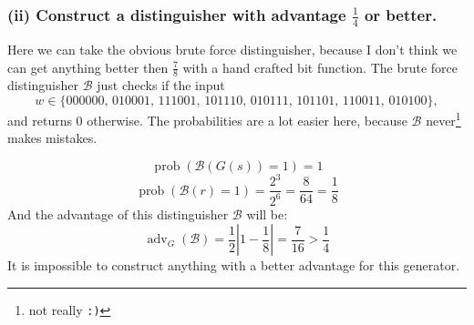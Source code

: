 \documentclass{article}
\begin{document}
  \subsubsection*{(ii) Construct a distinguisher with advantage $\frac{1}{4}$ or better.}
  Here we can take the obvious brute force distinguisher, because I don't think we can get anything better then $\frac{7}{8}$ with a hand crafted bit function.
  The brute force distinguisher $\mathcal{B}$ just checks if the input
  \[w \in \{000000,\, 010001,\, 111001,\, 101110,\, 010111,\, 101101,\, 110011,\, 010100\},\]
  and returns 0 otherwise.
  The probabilities are a lot easier here, because $\mathcal{B}$ never\footnote{not really \texttt{:)}} makes mistakes.

  \[\operatorname{prob}(\mathcal{B}(G(s)) = 1) = 1  \]
  \[\operatorname{prob}(\mathcal{B}(r) = 1) = \frac{2^3}{2^6} = \frac{8}{64} = \frac{1}{8} \]
  And the advantage of this distinguisher $\mathcal{B}$ will be:
  \[ \operatorname{adv}_G(\mathcal{B}) = \frac{1}{2}\left|1 - \frac{1}{8}\right| = \frac{7}{16} > \frac{1}{4} \]
  It is impossible to construct anything with a better advantage for this generator.
\end{document}
